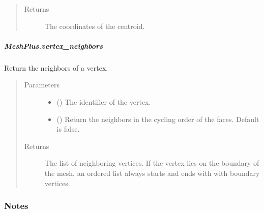 \documentclass[letterpaper,10pt,english]{sphinxmanual}
\begin{document}
\begin{fulllineitems}
\begin{fulllineitems}
\begin{quote}
\begin{description}
\item[{Returns}] \leavevmode
{} \textendash{} The coordinates of the centroid.

\end{description}\end{quote}

\end{fulllineitems}



\subparagraph{MeshPlus.vertex\_neighbors}
\label{\detokenize{api/generated/directional_clustering.mesh.MeshPlus.vertex_neighbors:meshplus-vertex-neighbors}}\label{\detokenize{api/generated/directional_clustering.mesh.MeshPlus.vertex_neighbors::doc}}

\begin{fulllineitems}
\label{\detokenize{api/generated/directional_clustering.mesh.MeshPlus.vertex_neighbors:directional_clustering.mesh.MeshPlus.vertex_neighbors}}
Return the neighbors of a vertex.
\begin{quote}\begin{description}
\item[{Parameters}] \leavevmode\begin{itemize}
\item {} 
 () \textendash{} The identifier of the vertex.

\item {} 
 () \textendash{} Return the neighbors in the cycling order of the faces.
Default is false.

\end{itemize}

\item[{Returns}] \leavevmode
{} \textendash{} The list of neighboring vertices.
If the vertex lies on the boundary of the mesh,
an ordered list always starts and ends with with boundary vertices.

\end{description}\end{quote}
\subsubsection*{Notes}


\end{fulllineitems}
\end{fulllineitems}
\end{document}
